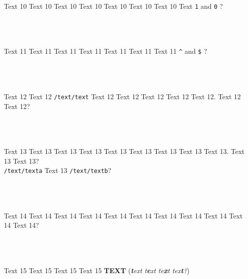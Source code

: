 \documentclass[9pt]{exam}
\begin{document}
\begin{questions}
\question
    Text 10 Text 10 Text 10 Text 10 Text 10 Text 10 Text 10
    Text \texttt{1} and \texttt{0} ?\\\\
    \makebox[0.9\textwidth]{\$ \enspace\hrulefill}\\\\
    \makebox[0.9\textwidth]{\enspace\hrulefill}

\question
    Text 11 Text 11 Text 11 Text 11 Text 11 Text 11 Text 11
    \texttt{\textasciicircum{}} and \texttt{\$} ?\\\\
    \makebox[0.9\textwidth]{\$ \enspace\hrulefill}\\\\
    \makebox[0.9\textwidth]{\enspace\hrulefill}

\question
    Text 12 Text 12 \texttt{/text/text} Text 12 Text 12 Text 12
    Text 12 Text 12. Text 12 Text 12?\\\\
    \makebox[0.9\textwidth]{\$ \enspace\hrulefill}\\\\
    \makebox[0.9\textwidth]{\enspace\hrulefill}

\question
    Text 13 Text 13 Text 13 Text 13 Text 13 Text 13 Text 13
    Text 13 Text 13. Text 13 Text 13?\\
    \texttt{/text/texta} Text 13 \texttt{/text/textb}?\\\\
    \makebox[0.9\textwidth]{\$ \enspace\hrulefill}\\\\
    \makebox[0.9\textwidth]{\enspace\hrulefill}

\question
    Text 14 Text 14 Text 14 Text 14 Text 14 Text 14 Text 14
    Text 14 Text 14 Text 14 Text 14?\\\\
    \makebox[0.9\textwidth]{\$ \enspace\hrulefill}\\\\
    \makebox[0.9\textwidth]{\enspace\hrulefill}

\question
    Text 15 Text 15 Text 15 Text 15 \textbf{TEXT}
    (\emph{\textbf{t}ext t\textbf{e}xt te\textbf{x}t tex\textbf{t}?})\\\\
    \makebox[0.9\textwidth]{\$ \enspace\hrulefill}\\\\
    \makebox[0.9\textwidth]{\enspace\hrulefill}


\end{questions}
\end{document}
